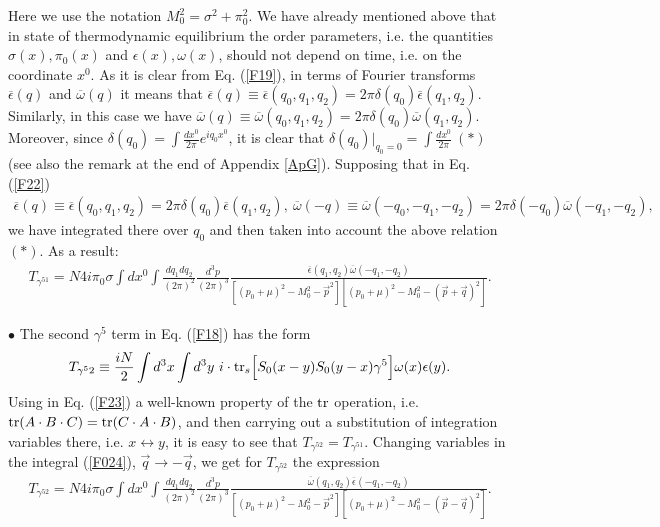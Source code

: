 \documentclass[12pt,a4paper]{article}
\begin{document}
Here we use the notation $M_0^2=\sigma^2+\pi_0^2$. We have already
mentioned above that in state of thermodynamic equilibrium the order parameters, i.e. the
quantities $\sigma (x),\pi_0(x)$ and $\epsilon (x),\omega(x)$, should not depend on time, i.e. on the coordinate $x^0$. As it is clear from Eq. (\ref{F19}), in terms of Fourier transforms $\overline \epsilon (q)$ and $\overline \omega (q)$ it means that
$\overline \epsilon (q)\equiv \overline \epsilon (q_0,q_1,q_2)=2\pi \delta (q_0)\overline \epsilon (q_1,q_2)$. Similarly, in this case we have $\overline \omega(q)\equiv \overline \omega (q_0,q_1,q_2)=2\pi \delta (q_0)\overline \omega (q_1,q_2)$. Moreover, since $\delta (q_0)=\int\frac{dx^0}{2\pi}e^{iq_0x^0}$, it is clear
that $\delta (q_0){\Big |}_{q_0=0}=\int\frac{dx^0}{2\pi} ~(*)$ (see also the remark at the end of Appendix \ref{ApG}). Supposing that in Eq. (\ref{F22})
\begin{eqnarray}
\overline \epsilon (q)\equiv \overline \epsilon (q_0,q_1,q_2)=2\pi \delta (q_0)\overline
\epsilon (q_1,q_2),~\overline \omega(-q)\equiv \overline \omega (-q_0,-q_1,-q_2)=2\pi \delta (-q_0)\overline \omega (-q_1,-q_2),
\label{0F23}
\end{eqnarray}
we have integrated there over $q_0$ and then taken into account the above relation $(*)$. As a result:
\begin{eqnarray}
T_{\gamma^51}=N4i\pi_0\sigma\int dx^0\int \frac{dq_1dq_2}{(2\pi)^2}\frac{d^3p}{(2\pi)^3}\frac{\overline \epsilon (q_1,q_2)\overline \omega (-q_1,-q_2)}{[(p_0+\mu)^2-M_0^2-\vec p^2][(p_0+\mu)^2-M_0^2-(\vec p+\vec q)^2]}.
\label{F024}
\end{eqnarray}

$\bullet$ The second $\gamma^5$ term in Eq. (\ref{F18}) has the form
\begin{eqnarray}
T_{\gamma^52}\equiv\frac{iN}{2}\int d^3x\int d^3y~
i\cdot {\rm tr}_s\Big[S_0(x-y)S_0(y-x)\gamma^5\Big]\omega(x)\epsilon(y).
\label{F23}
\end{eqnarray}
Using in Eq. (\ref{F23}) a well-known property of the  ${\rm tr}$ operation, i.e. ${\rm tr}
(A\cdot B\cdot C)={\rm tr}(C\cdot A\cdot B)$, and then carrying out a substitution of
integration variables there, i.e. $x\leftrightarrow y$, it is easy to see that
$T_{\gamma^52}=T_{\gamma^51}$. Changing variables in the integral (\ref{F024}), $\vec q\to -\vec q$, we get for $T_{\gamma^52}$ the expression
\begin{eqnarray}
T_{\gamma^52}=N4i\pi_0\sigma\int dx^0\int \frac{dq_1dq_2}{(2\pi)^2}\frac{d^3p}{(2\pi)^3}\frac{\overline \omega (q_1,q_2)\overline \epsilon (-q_1,-q_2)}{[(p_0+\mu)^2-M_0^2-\vec p^2][(p_0+\mu)^2-M_0^2-(\vec p-\vec q)^2]}.
\label{F023}
\end{eqnarray}
\end{document}
